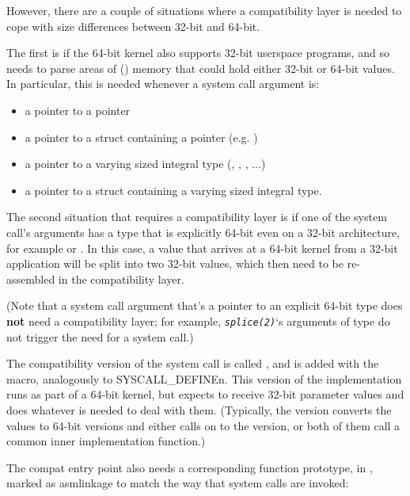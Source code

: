 \documentclass[a4paper,8pt,english]{sphinxmanual}
\begin{document}
However, there are a couple of situations where a compatibility layer is
needed to cope with size differences between 32-bit and 64-bit.

The first is if the 64-bit kernel also supports 32-bit userspace programs, and
so needs to parse areas of () memory that could hold either 32-bit or
64-bit values.  In particular, this is needed whenever a system call argument
is:
\begin{itemize}
\item {} 
a pointer to a pointer

\item {} 
a pointer to a struct containing a pointer (e.g. )

\item {} 
a pointer to a varying sized integral type (, ,
, ...)

\item {} 
a pointer to a struct containing a varying sized integral type.

\end{itemize}

The second situation that requires a compatibility layer is if one of the
system call's arguments has a type that is explicitly 64-bit even on a 32-bit
architecture, for example  or .  In this case, a value that
arrives at a 64-bit kernel from a 32-bit application will be split into two
32-bit values, which then need to be re-assembled in the compatibility layer.

(Note that a system call argument that's a pointer to an explicit 64-bit type
does \textbf{not} need a compatibility layer; for example, \emph{\texttt{splice(2)}}`s arguments of
type  do not trigger the need for a  system call.)

The compatibility version of the system call is called ,
and is added with the  macro, analogously to
SYSCALL\_DEFINEn.  This version of the implementation runs as part of a 64-bit
kernel, but expects to receive 32-bit parameter values and does whatever is
needed to deal with them.  (Typically, the  version converts the
values to 64-bit versions and either calls on to the  version, or both of
them call a common inner implementation function.)

The compat entry point also needs a corresponding function prototype, in
, marked as asmlinkage to match the way that system
calls are invoked:
\end{document}
